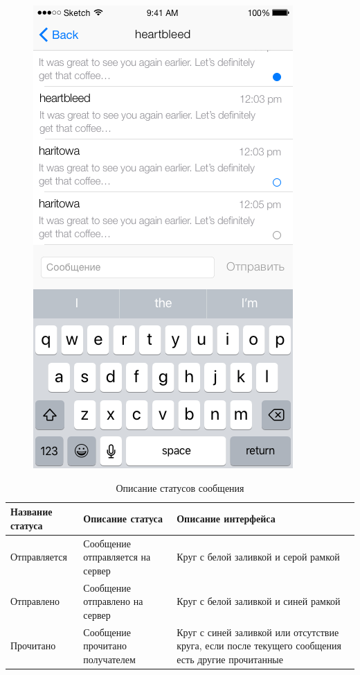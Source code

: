 \begin{figure}[H]
\begin{minipage}{.5\textwidth}
  \includegraphics[height=0.25\textheight]{inc/img/ui/single_dialogue.png}
  \label{sec:usage:dialogues:single}
\end{minipage}
\end{figure}

\begin{table}[!ht]
  \caption{Описание статусов сообщения}
  \label{table:usage:dialogues:statusdesc}
  \centering
  \begin{tabularx}{\linewidth}{
    |>{\centering\hsize=0.75\hsize}X|
    >{\centering\hsize=1\hsize}X|
    >{\centering\arraybackslash\hsize=1.25\hsize}X|
  }
	\hline
	Название статуса & Описание статуса & Описание интерфейса \\

	\hline
	Отправляется & Сообщение отправляется на сервер & Круг с белой заливкой и серой рамкой \\

	\hline
	Отправлено & Сообщение отправлено на сервер & Круг с белой заливкой и синей рамкой \\

	\hline
	Прочитано & Сообщение прочитано получателем & Круг с синей заливкой или отсутствие круга, если после текущего сообщения есть другие прочитанные \\

	\hline
  \end{tabularx}
\end{table}